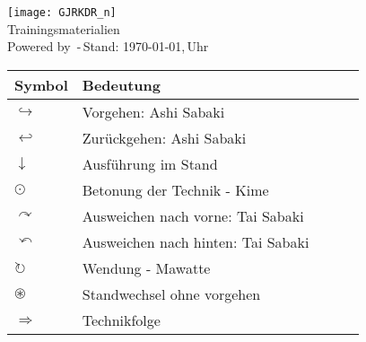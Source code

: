 \setcounter{num}{0}
\setcounter{numz}{0}
\begin{tcolorbox}[colframe=SGL2,colback=white,coltitle=black,title=G\={o}j\={u}-Ry\={u} Karate-D\={o} Langenfeld-Reusrath]
	\begin{center}
		\texttt{[image: GJRKDR\_n]}\\
		Trainingsmaterialien\\{\scriptsize \textsf{Powered by} \LaTeXe \textsf{\,-\,Stand: \today,\,\currenttime Uhr}} 
	\end{center}
\end{tcolorbox}
\clearpage
\pagebreak
\setcounter{num}{0}
\setcounter{numz}{0}	
\begin{tcolorbox}[colframe=SGL2,colback=white,coltitle=black,title=Allgemeines:\indent Erläuterungen]
	\begin{tabularx}{\textwidth}{lllll}
		Symbol	& Bedeutung	& &&\\
		\midrule
		\(\hookrightarrow\) 	& Vorgehen: Ashi Sabaki					& & &\\
		\(\hookleftarrow\) 		& Zurückgehen: Ashi Sabaki				& & &\\
		\(\downarrow\) 			& Ausführung im Stand					& & &\\
		\(\odot\) 				& Betonung der Technik - Kime			& & &\\
		\(\curvearrowright\)	& Ausweichen nach vorne: Tai Sabaki		& & &\\
		\(\curvearrowleft\)		& Ausweichen nach hinten: Tai Sabaki	& & &\\
		\(\circlearrowright\)	& Wendung - Mawatte						& & &\\
		\(\circledast\)			& Standwechsel ohne vorgehen			& & &\\
		\(\Rightarrow\)			& Technikfolge							& & &\\
	\end{tabularx}
\end{tcolorbox}
\clearpage
\pagebreak
